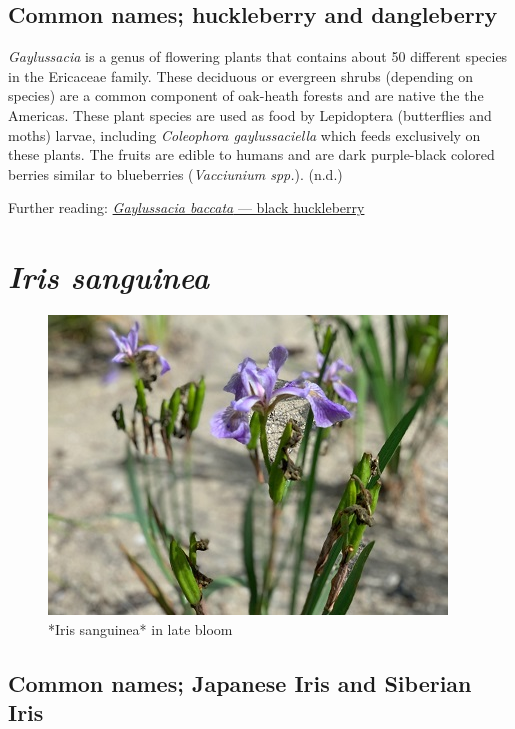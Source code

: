 \documentclass[
]{article}
\begin{document}
\hypertarget{common-names-huckleberry-and-dangleberry}{%
\subsection{Common names; huckleberry and dangleberry}\label{common-names-huckleberry-and-dangleberry}}

\emph{Gaylussacia} is a genus of flowering plants that contains about 50 different species in the Ericaceae family. These deciduous or evergreen shrubs (depending on species) are a common component of oak-heath forests and are native the the Americas. These plant species are used as food by Lepidoptera (butterflies and moths) larvae, including \emph{Coleophora gaylussaciella} which feeds exclusively on these plants. The fruits are edible to humans and are dark purple-black colored berries similar to blueberries (\emph{Vacciunium spp.}). (n.d.)

Further reading: \href{https://www.fs.fed.us/wildflowers/beauty/mycotrophic/monotropa_hypopitys.shtml}{\emph{Gaylussacia baccata} --- black huckleberry}

\hypertarget{iris-sanguinea}{%
\section{\texorpdfstring{\emph{Iris sanguinea}}{Iris sanguinea}}\label{iris-sanguinea}}

\begin{figure}

{\centering \includegraphics[width=0.5\linewidth]{irissan} 

}

\caption{*Iris sanguinea* in late bloom}\label{fig:iris}
\end{figure}

\hypertarget{common-names-japanese-iris-and-siberian-iris}{%
\subsection{Common names; Japanese Iris and Siberian Iris}\label{common-names-japanese-iris-and-siberian-iris}}
\end{document}
